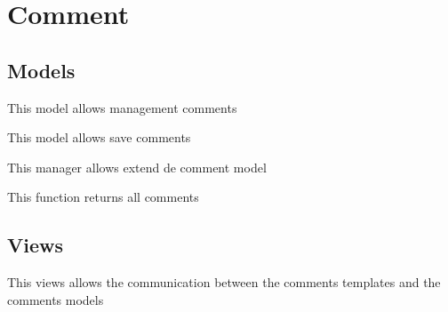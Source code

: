\documentclass[letterpaper,10pt,english]{sphinxmanual}
\begin{document}
\section{Comment}
\label{modules/comment:comment}\label{modules/comment::doc}

\subsection{Models}
\label{modules/comment:models}
This model allows management comments
\label{modules/comment:module-apps.comments.models}

\begin{fulllineitems}
\label{modules/comment:apps.comments.models.Comment}
This model allows save comments

\end{fulllineitems}


\begin{fulllineitems}
\label{modules/comment:apps.comments.models.CommentManager}
This manager allows extend de comment model

\begin{fulllineitems}
\label{modules/comment:apps.comments.models.CommentManager.getComments}
This function returns all comments

\end{fulllineitems}


\end{fulllineitems}



\subsection{Views}
\label{modules/comment:views}
This views allows the communication between the comments templates and the comments models
\label{modules/comment:module-apps.comments.views}
\end{document}
